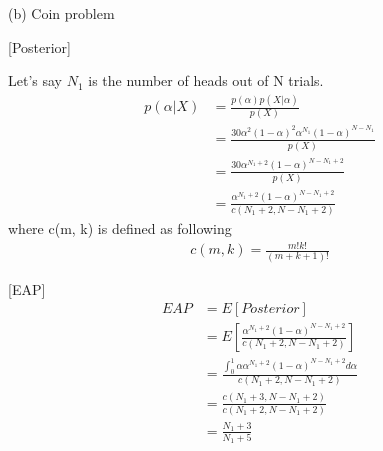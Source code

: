 \documentclass[11pt]{article}
\theoremstyle{definition}
\begin{document}
(b) Coin problem

[Posterior]

Let's say $N_1$ is the number of heads out of N trials.
\begin{equation*}
\begin{split}
 p(\alpha | X ) & =  \frac{p(\alpha)p(X|\alpha)}{p(X)}  \\
& = \frac{30\alpha^2(1-\alpha)^2\alpha^{N_1} (1-\alpha)^{N-{N_1}}}{p(X)}  \\
& = \frac{30\alpha^{N_1+2} (1-\alpha)^{N-{N_1}+2}}{p(X)}  \\
& = \frac{\alpha^{N_1+2} (1-\alpha)^{N-{N_1}+2}}{c(N_1 +2, N - N_1 +2)} 
\end{split}
\end{equation*}
where c(m, k) is defined as following
\begin{equation*}
\begin{split}
c(m, k) = \frac{m!k!}{(m+k+1)!} 
\end{split}
\end{equation*}

[EAP]
\begin{equation*}
\begin{split}
EAP & = E[Posterior]  \\
& = E[\frac{\alpha^{N_1+2} (1-\alpha)^{N-{N_1}+2}}{c(N_1 +2, N - N_1 +2)}]  \\
& = \frac{\int_{0}^{1}\alpha \alpha^{N_1+2} (1-\alpha)^{N-{N_1}+2} d\alpha}{c(N_1 +2, N - N_1 +2)}  \\
& = \frac{c(N_1 +3, N - N_1 +2)}{c(N_1 +2, N - N_1 +2)}  \\
& = \frac{N_1 + 3}{N_1 + 5}
\end{split}
\end{equation*}
\end{document}

